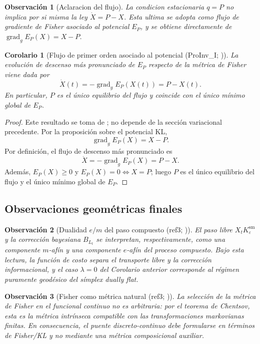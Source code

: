 ﻿\documentclass[12pt]{article}
\newcommand{\fuentecite}[2]{\textnormal{(#1; \citealp{#2})}}
\newtheorem{corolario}{Corolario}[section]
\newtheorem{observacion}{Observación}[section]
\begin{document}
\begin{observacion}[Aclaracion del flujo]
La condicion estacionaria \(q=P\) no implica por si misma la ley \(\dot X=P-X\). Esta ultima se adopta como flujo de gradiente de Fisher asociado al potencial \(E_P\), y se obtiene directamente de \(\operatorname{grad}_g E_P(X)=X-P\).
\end{observacion}
\begin{corolario}[Flujo de primer orden asociado al potencial \fuentecite{ProInv\_I}{ControlInformacional2026}]
La evolución de descenso más pronunciado de \(E_P\) respecto de la métrica de Fisher viene dada por
\[
\dot X(t)=-\operatorname{grad}_gE_P(X(t))=P-X(t).
\]
En particular, \(P\) es el único equilibrio del flujo y coincide con el único mínimo global de \(E_P\).
\end{corolario}
\begin{proof}
Este resultado se toma de \cite{ControlInformacional2026}; no depende de la sección variacional precedente.
Por la proposición sobre el potencial KL,
\[
\operatorname{grad}_gE_P(X)=X-P.
\]
Por definición, el flujo de descenso más pronunciado es
\[
\dot X=-\operatorname{grad}_gE_P(X)=P-X.
\]
Además, \(E_P(X)\ge 0\) y \(E_P(X)=0\iff X=P\); luego \(P\) es el único equilibrio del flujo y el único mínimo global de \(E_P\).
\end{proof}

\subsection{Observaciones geométricas finales}

\begin{observacion}[Dualidad \(e/m\) del paso compuesto \fuentecite{ref3}{Amari2016}]
El paso libre \(X_tK_\varepsilon^{\mathrm{sm}}\) y la corrección bayesiana \(B_{L_t}\) se interpretan, respectivamente, como una componente \(m\)-afín y una componente \(e\)-afín del proceso compuesto. Bajo esta lectura, la función de costo separa el transporte libre y la corrección informacional, y el caso \(\lambda=0\) del Corolario anterior corresponde al régimen puramente geodésico del símplex dually flat.
\end{observacion}

\begin{observacion}[Fisher como métrica natural \fuentecite{ref3}{Amari2016,Chentsov1982}]
La selección de la métrica de Fisher en el funcional continuo no es arbitraria: por el teorema de Chentsov, esta es la métrica intrínseca compatible con las transformaciones markovianas finitas. En consecuencia, el puente discreto-continuo debe formularse en términos de Fisher/KL y no mediante una métrica composicional auxiliar.
\end{observacion}
\end{document}
